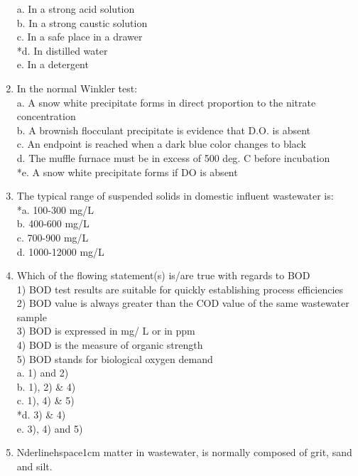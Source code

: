 \begin{enumerate}
a. In a strong acid solution \\
b. In a strong caustic solution \\
c. In a safe place in a drawer \\
*d. In distilled water \\
e. In a detergent 

\item  In the normal Winkler test: \\

a. A snow white precipitate forms in direct proportion to the nitrate concentration \\
b. A brownish flocculant precipitate is evidence that D.O. is absent \\
c. An endpoint is reached when a dark blue color changes to black \\
d. The muffle furnace must be in excess of 500 deg. C before incubation \\
*e. A snow white precipitate forms if DO is absent 

\item  The typical range of suspended solids in domestic influent wastewater is: \\

*a. 100-300 mg/L \\
b. 400-600 mg/L \\
c. 700-900 mg/L \\
d. 1000-12000 mg/L 

\item  Which of the flowing statement(s) is/are true with regards to BOD\\
1) BOD test results are suitable for quickly establishing process efficiencies\\
2) BOD value is always greater than the COD value of the same wastewater sample\\
3) BOD is expressed in mg/ L or in ppm\\
4) BOD is the measure of organic strength\\
5) BOD stands for biological oxygen demand\\

a. 1) and 2) \\
b. 1), 2) \& 4) \\
c. 1), 4) \& 5) \\
*d. 3) \& 4) \\
e. 3), 4) and 5) 

\item  {Nderline{hspace{1cm}}} matter in wastewater, is normally composed of grit, sand and silt. \\


\end{enumerate}
